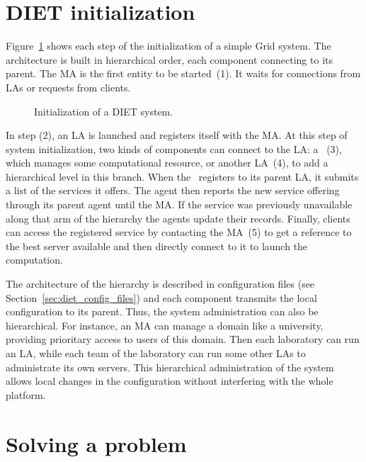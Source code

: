 \section{DIET initialization}
\label{init}

Figure~\ref{fig:init} shows each step of the initialization of a
simple Grid system. The architecture is built in hierarchical order,
each component connecting to its parent. The MA is the first entity to
be started~(1). It waits for connections from LAs or requests from
clients.

\begin{figure}[hbt]
  \begin{center}
    \caption{Initialization of a DIET system.}
    \label{fig:init}
  \end{center}
\end{figure}

In step (2), an LA is launched and registers itself with the MA.
At this step of system initialization, two kinds of components can
connect to
the LA: a \sed ~(3), which manages some computational resource, or
another LA~(4), to add a hierarchical level in this branch. When the
\sed\ registers to its parent LA, it submits a list of the services it
offers.  The agent then reports the new service offering through its
parent agent until the MA.  If the service was previously unavailable
along that arm of the hierarchy the agents update their records.
Finally, clients can access the registered service by contacting
the MA~(5) to get a reference to the best server available and then
directly connect to it to launch the computation.

The architecture of the hierarchy is described in configuration files
(see Section~\ref{sec:diet_config_files})
and each component transmits the local configuration to its
parent. Thus, the system administration can also be hierarchical. For
instance, an MA can manage a domain like a university, providing
prioritary access to users of this domain. Then each laboratory can
run an LA, while each team of the laboratory can run some other LAs to
administrate its own servers. This hierarchical administration of the
system allows local changes in the configuration without interfering
with the whole platform.



\section{Solving a problem}
\label{sec:solvepb}

